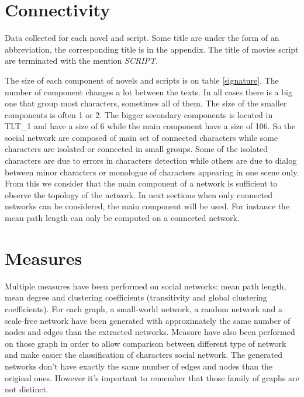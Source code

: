 \documentclass[a4paper, 12pt]{report}
\begin{document}
\section{Connectivity}

\begin{table}[]
\caption{Data collected for each novel and script. Some title are under the form of an abbreviation, the corresponding title
 is in the appendix. The title of movies script are terminated with the mention \textit{SCRIPT}.}
 \label{signature}
\end{table}

The size of each component of novels and scripts is on table \ref{signature}. The number of component changes a lot between the texts. In all cases there is a big one that group most characters, sometimes all of them. The size of the smaller components is often 1 or 2. The bigger secondary components is located in TLT\_1 and have a size of 6 while the main component have a size of 106. So the social network are composed of main set of connected characters while some characters are isolated or connected in small groups. Some of the isolated characters are due to errors in characters detection while others are due to dialog between minor characters or monologue of characters appearing in one scene only. From this we consider that the main component of a network is sufficient to observe the topology of the network. In next sections when only connected networks can be considered, the main component will be used. For instance the mean path length can only be computed on a connected network.


\section{Measures}
Multiple measures have been performed on social networks: mean path length, mean degree and clustering coefficients (transitivity and global clustering coefficients). For each graph, a small-world network, a random network and a scale-free network have been generated with approximately the same number of nodes and edges than the extracted networks. Measure have also been performed on those graph in order to allow comparison between different type of network and make easier the classification of characters social network. The generated networks don't have exactly the same number of edges and nodes than the original ones. However it's important to remember that those family of graphs are not distinct.\\
\end{document}
